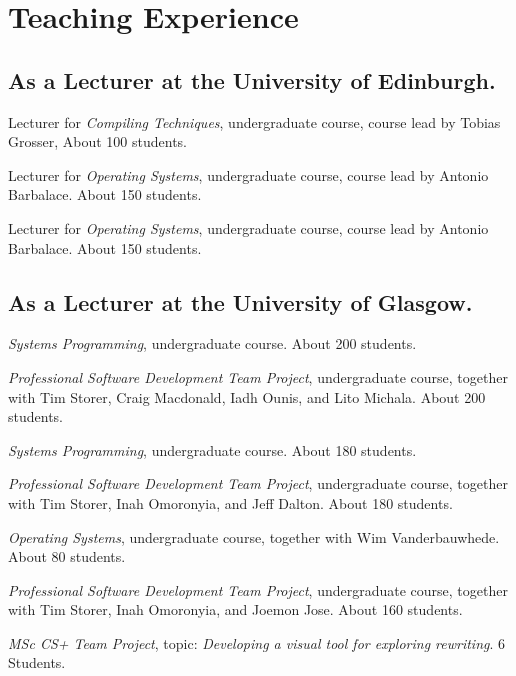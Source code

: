 \section{Teaching Experience}

\subsection{As a Lecturer at the University of Edinburgh.}

\begin{cvitemize}[2021 - 2022]
    \item Lecturer for \emph{Compiling Techniques}, undergraduate course, course lead by Tobias Grosser, About 100 students.
    \item Lecturer for \emph{Operating Systems}, undergraduate course, course lead by Antonio Barbalace. About 150 students.
\end{cvitemize}

\begin{cvitemize}[2020 - 2021]
    \item Lecturer for \emph{Operating Systems}, undergraduate course, course lead by Antonio Barbalace. About 150 students.
\end{cvitemize}

\subsection{As a Lecturer at the University of Glasgow.}

\begin{cvitemize}[2019 - 2020]
    \item \emph{Systems Programming}, undergraduate course. About 200 students.
    \item \emph{Professional Software Development Team Project}, undergraduate course, together with  Tim Storer, Craig Macdonald, Iadh Ounis, and Lito Michala. About 200 students.
\end{cvitemize}

\begin{cvitemize}[2018 - 2019]
    \item \emph{Systems Programming}, undergraduate course. About 180 students.
    \item \emph{Professional Software Development Team Project}, undergraduate course, together with  Tim Storer, Inah Omoronyia, and Jeff Dalton. About 180 students.
\end{cvitemize}

\begin{cvitemize}[2017 - 2018]
    \item \emph{Operating Systems}, undergraduate course, together with Wim Vanderbauwhede. About 80 students.
    \item \emph{Professional Software Development Team Project}, undergraduate course, together with  Tim Storer, Inah Omoronyia, and Joemon Jose. About 160 students.
    \item \emph{MSc CS+ Team Project}, topic: \emph{Developing a visual tool for exploring rewriting}. 6 Students.
\end{cvitemize}

